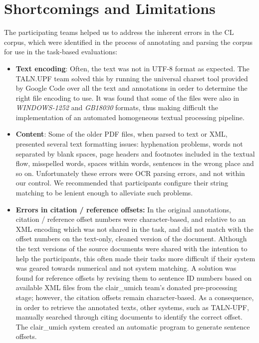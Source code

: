 \documentclass[11pt]{article}
\begin{document}
\section{Shortcomings and Limitations}
\label{sec:limitations}
The participating teams helped us to address the inherent errors in the CL corpus, which were identified in the process of annotating and parsing the corpus for use in the task-based evaluations:
\begin{itemize}
\item \textbf{Text encoding}: Often, the text was not in UTF-8 format as expected. The TALN.UPF team solved this by running the universal charset tool provided by Google Code over all the text and annotations in order to determine the right file encoding to use. It was found that some of the files were also in \textit{WINDOWS-1252} and \textit{GB18030} formats, thus making difficult the implementation of an automated homogeneous textual processing pipeline.
\vspace{-.3cm}
\item \textbf{Content}: Some of the older PDF files, when parsed to text or XML, presented several text formatting issues: hyphenation problems, words not separated by blank spaces, page headers and footnotes included in the textual flow, misspelled words, spaces within words, sentences in the wrong place and so on. Unfortunately these errors were OCR parsing errors, and not within our control. We recommended that  participants configure their string matching to be lenient enough to alleviate such problems.
\vspace{-.3cm}
\item \textbf{Errors in citation / reference offsets:} In the original annotations, citation / reference offset numbers were character-based, and relative to an XML encoding which was not shared in the task, and did not match with the offset numbers on the text-only, cleaned version of the document. Although the text versions of the source documents were shared with the intention to help the participants, this often made their tasks more difficult if their system was geared towards numerical and not system matching. A solution was found for reference offsets by revising them to sentence ID numbers based on available XML files from the clair\_umich team's donated pre-processing stage; however, the citation offsets remain character-based. As a consequence, in order to retrieve the annotated texts, other systems, such as TALN-UPF, manually searched through citing documents to identify the correct offset. The clair\_umich system created an automatic program to generate sentence offsets.

\end{itemize}
\end{document}
